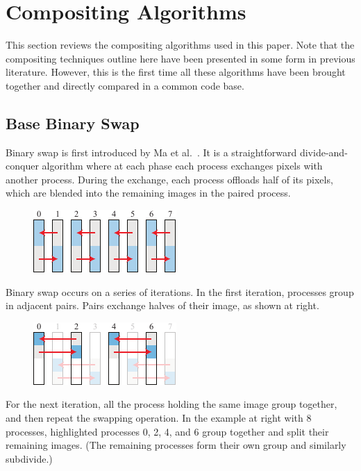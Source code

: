 \documentclass{vgtc}                          %
\newcommand*{\scite}[1]{~\cite{#1}}
\newcommand{\etal}{et al.\xspace}
\begin{document}
\section{Compositing Algorithms}

This section reviews the compositing algorithms used in this paper.
Note that the compositing techniques outline here have been presented in some form in previous literature.
However, this is the first time all these algorithms have been brought together and directly compared in a common code base.

\setlength{\intextsep}{0pt}
\setlength{\columnsep}{2ex}

\subsection{Base Binary Swap}
\label{sec:BinarySwap}

Binary swap is first introduced by Ma \etal\scite{BinarySwap1}.
It is a straightforward divide-and-conquer algorithm where at each phase each process exchanges pixels with another process.
During the exchange, each process offloads half of its pixels, which are blended into the remaining images in the paired process.

\begin{figure}
  \includegraphics[scale=.75]{binary-swap-1}
\end{figure}
Binary swap occurs on a series of iterations.
In the first iteration, processes group in adjacent pairs.
Pairs exchange halves of their image, as shown at right.

\begin{figure}
  \includegraphics[scale=.75]{binary-swap-2}
\end{figure}
For the next iteration, all the process holding the same image group together, and then repeat the swapping operation.
In the example at right with 8 processes, highlighted processes 0, 2, 4, and 6 group together and split their remaining images.
(The remaining processes form their own group and similarly subdivide.)
\end{document}
